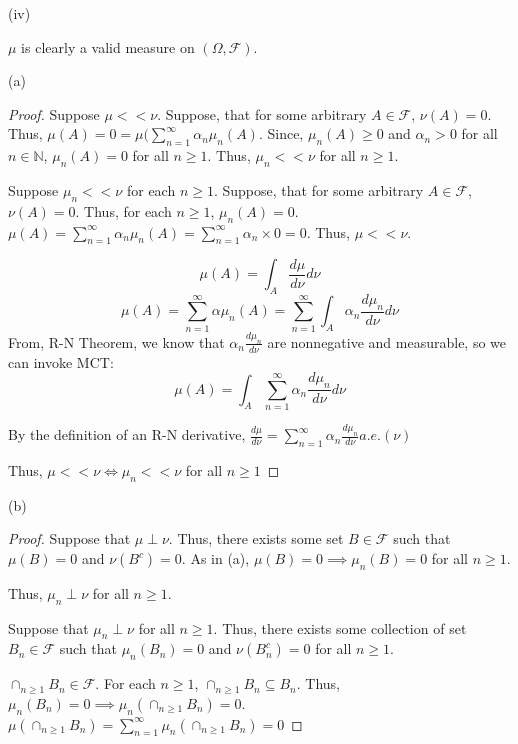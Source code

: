 \documentclass[12pt,letterpaper, onecolumn]{exam}
\newcommand{\nat}{\mathbb{N}}
\newcommand{\calF}{\mathcal{F}}
\newcommand{\cutesum}[1]{\sum_{#1 = 1}^\infty}
\begin{document}
\begin{questions}
\begin{solution}
            (iv) 

           $\mu$ is clearly a valid measure on $(\Omega, \calF)$. 

           (a)
           \begin{proof}
                Suppose $\mu << \nu$. Suppose, that for some arbitrary $A \in \calF$, $\nu(A) = 0$. Thus, $\mu(A) = 0 = \mu(\sum_{n = 1}^\infty \alpha_n \mu_n(A)$. Since, $\mu_n(A) \geq 0$ and $\alpha_n > 0$ for all $n \in \nat$, $\mu_n(A) = 0$ for all $n \geq 1$. Thus, $\mu_n << \nu$ for all $n \geq 1$.

                 Suppose $\mu_n << \nu$ for each $n \geq 1$. Suppose, that for some arbitrary $A \in \calF$, $\nu(A) = 0$. Thus, for each $n \geq 1$, $\mu_n(A) = 0$. $\mu(A) = \cutesum{n} \alpha_n \mu_n(A) = \cutesum{n} \alpha_n \times 0 = 0$. Thus, $\mu << \nu$.

                 \[\mu(A) = \int_A \frac{d \mu}{d\nu} d\nu\]
                 \[\mu(A) = \cutesum{n} \alpha \mu_n(A) = \cutesum{n} \int_A \alpha_n  \frac{d \mu_n}{d \nu} d\nu\]
                 From, R-N Theorem, we know that $\alpha_n \frac{d \mu_n}{d\nu}$ are nonnegative and measurable, so we can invoke MCT:
                 \[\mu(A) = \int_A \cutesum{n}\alpha_n \frac{d \mu_n}{d\nu} d\nu\]

                 By the definition of an R-N derivative, $\frac{d \mu}{d\nu} = \cutesum{n} \alpha_n \frac{d \mu_n}{d\nu} a.e.(\nu)$

                 Thus, $\mu << \nu \iff \mu_n << \nu$ for all $n \geq 1$
            \end{proof}

            (b) \begin{proof}
                Suppose that $\mu \perp \nu$. Thus, there exists some set $B \in \calF$ such that $\mu(B) = 0$ and $\nu(B^c) = 0$. As in (a), $\mu(B) = 0 \implies \mu_n(B) = 0$ for all $n \geq 1$.

                Thus, $\mu_n \perp \nu$ for all $n \geq 1$.

                Suppose that $\mu_n \perp \nu$ for all $n \geq 1$. Thus, there exists some collection of set $B_n \in \calF$ such that $\mu_n(B_n) = 0$ and $\nu(B_n^c) = 0$ for all $n \geq 1$. 
                
                $\cap_{n \geq 1} B_n \in \calF$. For each $n \geq 1$, $\cap_{n\geq1} B_n \subseteq B_n$. Thus, $\mu_n(B_n) = 0 \implies \mu_n(\cap_{n\geq 1}B_n) = 0$. $\mu(\cap_{n\geq 1} B_n) = \cutesum{n}\mu_n(\cap_{n\geq 1} B_n) = 0$


\end{proof}
\end{solution}
\end{questions}
\end{document}
